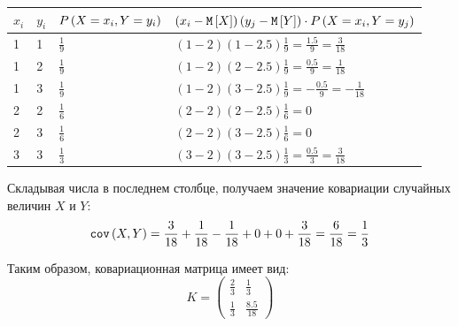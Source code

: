 \begin{enumerate}
    \begin{tabular}{|p{1cm}|p{1cm}|p{4cm}|p{8cm}|}
        \hline
        $x_i$ & $y_i$ & $P \left ( X=x_i, Y=y_i \right )$ & $\left ( x_i - \mathtt{M} \left [ X \right ] \right ) \left ( y_j - \mathtt{M} \left [ Y \right ] \right ) \cdot P \left ( X=x_i, Y=y_j \right )$ \\
        \hline
        1     & 1     & $\frac{1}{9}$                & $( 1 - 2 ) ( 1 - 2.5 ) \frac{1}{9} = \frac{1.5}{9} = \frac{3}{18}$                                               \\
        \hline
        1     & 2     & $\frac{1}{9}$                & $( 1 - 2 ) ( 2 - 2.5 ) \frac{1}{9} = \frac{0.5}{9} = \frac{1}{18}$                                               \\
        \hline
        1     & 3     & $\frac{1}{9}$                & $( 1 - 2 ) ( 3 - 2.5 ) \frac{1}{9} = -\frac{0.5}{9} = - \frac{1}{18}$                                            \\
        \hline
        2     & 2     & $\frac{1}{6}$                & $( 2 - 2 ) ( 2 - 2.5 ) \frac{1}{6} = 0$                                                                          \\
        \hline
        2     & 3     & $\frac{1}{6}$                & $( 2 - 2 ) ( 3 - 2.5 ) \frac{1}{6} = 0$                                                                          \\
        \hline
        3     & 3     & $\frac{1}{3}$                & $( 3 - 2 ) ( 3 - 2.5 ) \frac{1}{3} = \frac{0.5}{3} = \frac{3}{18}$                                               \\
        \hline
    \end{tabular}

    Складывая числа в последнем столбце, получаем значение ковариации случайных величин $X$ и $Y$:
    \begin{equation}
        \texttt{cov} \left ( X , Y \right ) = \frac{3}{18} + \frac{1}{18} - \frac{1}{18} + 0 + 0 + \frac{3}{18} = \frac{6}{18} = \frac{1}{3}
    \end{equation}

    Таким образом, ковариационная матрица имеет вид:
    \begin{equation}
        K =
        \begin{pmatrix}
            \frac{2}{3} & \frac{1}{3}    \\
            \frac{1}{3} & \frac{8.5}{18}
        \end{pmatrix}
    \end{equation}


\end{enumerate}
